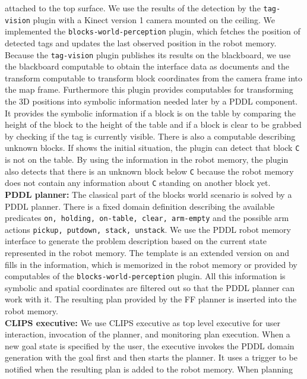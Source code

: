 attached to the top surface. We use the results of the detection by
the \texttt{tag-vision} plugin with a Kinect version 1 camera mounted
on the ceiling. We implemented the \texttt{blocks-world-perception}
plugin, which fetches the position of detected tags and updates the
last observed position in the robot memory. Because the
\texttt{tag-vision} plugin publishes its results on the blackboard, we
use the blackboard computable to obtain the interface data as
documents and the transform computable to transform block coordinates
from the camera frame into the map frame. Furthermore this plugin
provides computables for transforming the 3D positions into symbolic
information needed later by a PDDL component. It provides the symbolic
information if a block is on the table by comparing the height of the
block to the height of the table and if a block is clear to be grabbed
by checking if the tag is currently visible. There is also a
computable describing unknown blocks. If 
shows the initial situation, the plugin can detect that block
\texttt{C} is not on the table. By using the information in the robot
memory, the plugin also detects that there is an unknown block below
\texttt{C} because the robot memory does not contain any information
about \texttt{C} standing on another block yet.
\\
\textbf{PDDL planner:} The classical part of the blocks world scenario
is solved by a PDDL planner. There is a fixed domain definition
describing the available predicates \texttt{on, holding, on-table,
  clear, arm-empty} and the possible arm actions \texttt{pickup,
  putdown, stack, unstack}. We use the PDDL robot memory interface to
generate the problem description based on the current state
represented in the robot memory. The template is an extended version
on  and fills in the information, which is
memorized in the robot memory or provided by computables of the
\texttt{blocks-world-perception} plugin. All this information is
symbolic and spatial coordinates are filtered out so that the PDDL
planner can work with it. The resulting plan provided by the FF
planner is inserted into the robot memory.
\\
\textbf{CLIPS executive:} We use CLIPS executive as top level
executive for user interaction, invocation of the planner, and
monitoring plan execution. When a new goal state is specified by the
user, the executive invokes the PDDL domain generation with the goal
first and then starts the planner. It uses a trigger to be notified
when the resulting plan is added to the robot memory. When planning
